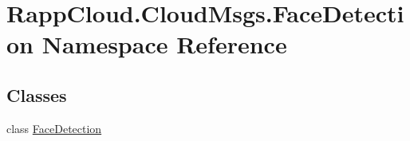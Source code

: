 \hypertarget{namespaceRappCloud_1_1CloudMsgs_1_1FaceDetection}{\section{Rapp\-Cloud.\-Cloud\-Msgs.\-Face\-Detection Namespace Reference}
\label{namespaceRappCloud_1_1CloudMsgs_1_1FaceDetection}
}
\subsection*{Classes}
\begin{DoxyCompactItemize}
\item 
class \hyperlink{classRappCloud_1_1CloudMsgs_1_1FaceDetection_1_1FaceDetection}{Face\-Detection}
\end{DoxyCompactItemize}
